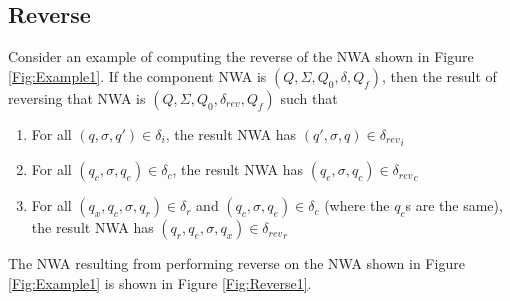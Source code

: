 \documentclass{llncs}
\begin{document}



\subsection{Reverse}
\label{Se:Reverse}

Consider an example of computing the reverse of the NWA shown in Figure \ref{Fig:Example1}.  If the component NWA is $(Q, \Sigma, Q_0, \delta, Q_f)$, then the result of reversing that NWA is $(Q, \Sigma, Q_0, \delta_{rev}, Q_f)$ such that

\begin{enumerate}

\item For all $(q,\sigma,q') \in \delta_i$, the result NWA has $(q',\sigma,q) \in {\delta_{rev}}_i$ 

\item For all $(q_c,\sigma,q_e) \in \delta_c$, the result NWA has $(q_e,\sigma,q_c) \in {\delta_{rev}}_c$

\item For all $(q_x,q_c,\sigma,q_r) \in \delta_r$ and $(q_c,\sigma,q_e) \in \delta_c$ (where the $q_c$s are the same), the result NWA has $(q_r,q_e,\sigma,q_x) \in {\delta_{rev}}_r$

\end{enumerate}

\noindent The NWA resulting from performing reverse on the NWA shown in Figure \ref{Fig:Example1} is shown in Figure \ref{Fig:Reverse1}.
 
\end{document}
